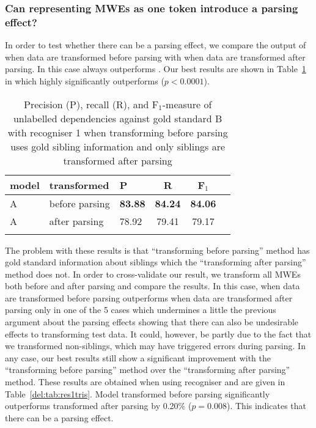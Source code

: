 \documentclass[output=paper]{langsci/langscibook}
\begin{document}
\subsubsection{Can representing MWEs as one token introduce a parsing effect?}
\indent In order to test whether there can be a parsing effect, we compare the output of {\modelA} when data are transformed before parsing with {\modelA} when data are transformed after parsing. In this case {\modelB} always outperforms {\modelA}. Our best results are shown in Table~\ref{del:tab:res1bisbis} in which {\modelB} highly significantly outperforms {\modelA} ($p<0.0001$).

\begin{table}[h]
    \centering
    \begin{tabular}{l l l c c c} %
      \lsptoprule
        \textnormal{model}
        & \textnormal{transformed}
        & \textnormal{P}
        & \textnormal{R}
        & \textnormal{F$_1$}
        \\ %
        \midrule
        A & before parsing &\textbf{83.88}  &\textbf{84.24}  & \textbf{84.06} \\
        A & after parsing &78.92  &79.41  & 79.17  \tabularnewline %
        \lspbottomrule
    \end{tabular}
    \caption{Precision (P), recall (R), and F$_1$-measure of unlabelled dependencies against gold standard B with recogniser 1 when transforming before parsing uses gold sibling information and only siblings are transformed after parsing\label{del:tab:res1bisbis}}
\end{table}

\indent The problem with these results is that ``transforming before parsing'' method has gold standard information about siblings which the ``transforming after parsing'' method does not. In order to cross-validate our result, we transform all MWEs both before and after parsing and compare the results. In this case, {\modelA} when data are transformed before parsing outperforms {\modelA} when data are transformed after parsing only in one of the 5 cases which undermines a little the previous argument about the parsing effects showing that there can also be undesirable effects to transforming test data. It could, however, be partly due to the fact that we transformed non-siblings, which may have triggered errors during parsing. In any case, our best results still show a significant improvement with the ``transforming before parsing'' method over the ``transforming after parsing'' method. These results are obtained when using recogniser and are given in Table~\ref{del:tab:res1tris}. Model transformed before parsing significantly outperforms {\modelA} transformed after parsing by 0.20\% ($p=0.008$). This indicates that there can be a parsing effect.
\end{document}
